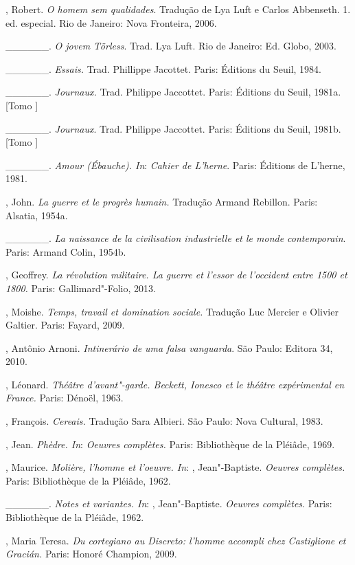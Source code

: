 \begin{Parskip}
, Robert. \emph{O homem sem qualidades}. Tradução de Lya Luft e
Carlos Abbenseth. 1. ed. especial. Rio de Janeiro: Nova Fronteira, 2006.

\_\_\_\_\_\_. \emph{O jovem Törless}. Trad. Lya Luft. Rio de Janeiro:
Ed. Globo, 2003.

\_\_\_\_\_\_. \emph{Essais.} Trad. Phillippe Jacottet. Paris: Éditions
du Seuil, 1984.

\_\_\_\_\_\_. \emph{Journaux.} Trad. Philippe Jaccottet. Paris:
Éditions du Seuil, 1981a. [Tomo ]

\_\_\_\_\_\_. \emph{Journaux}. Trad. Philippe Jaccottet. Paris:
Éditions du Seuil, 1981b. [Tomo ]

\_\_\_\_\_\_. \emph{Amour (Ébauche). In}: \emph{Cahier de L'herne}.
Paris: Éditions de L'herne, 1981.

, John. \emph{La guerre et le progrès humain.} Tradução Armand
Rebillon. Paris: Alsatia, 1954a.

\_\_\_\_\_\_. \emph{La naissance de la civilisation industrielle et le
monde contemporain}. Paris: Armand Colin, 1954b.

, Geoffrey. \emph{La révolution militaire. La guerre et l'essor
de l'occident entre 1500 et 1800.} Paris: Gallimard"-Folio, 2013.

, Moishe. \emph{Temps, travail et domination sociale.} Tradução
Luc Mercier e Olivier Galtier. Paris: Fayard, 2009.

, Antônio Arnoni. \emph{Intinerário de uma falsa vanguarda}. São Paulo:
Editora 34, 2010.

, Léonard. \emph{Théâtre d'avant"-garde. Beckett, Ionesco et
le théâtre expérimental en France.} Paris: Dénoël, 1963.

, François. \emph{Cereais.} Tradução Sara Albieri. São Paulo:
Nova Cultural, 1983.

, Jean. \emph{Phèdre. In}: \emph{Oeuvres complètes.} Paris:
Bibliothèque de la Pléiâde, 1969.

, Maurice. \emph{Molière, l'homme et l'oeuvre. In}: ,
Jean"-Baptiste. \emph{Oeuvres complètes.} Paris: Bibliothèque de la
Pléiâde, 1962.

\_\_\_\_\_\_. \emph{Notes et variantes. In}: ,
Jean"-Baptiste. \emph{Oeuvres complètes}. Paris: Bibliothèque de la Pléiâde, 1962.

, Maria Teresa. \emph{Du cortegiano au Discreto: l'homme accompli
chez Castiglione et Gracián.} Paris: Honoré Champion, 2009.


\end{Parskip}
